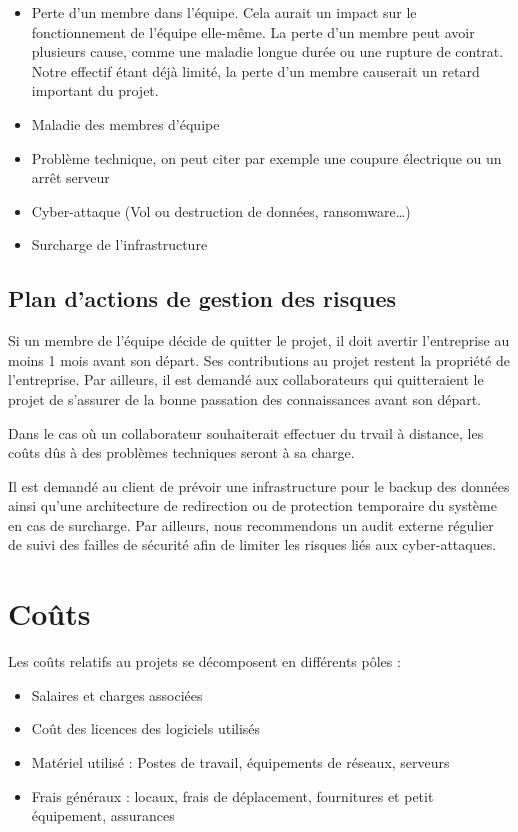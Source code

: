 \documentclass[a4paper]{article}
\begin{document}
\begin{itemize}
\item Perte d’un membre dans l’équipe. Cela aurait un impact sur le fonctionnement de l'équipe elle-même. La perte d'un membre peut avoir plusieurs cause, comme une maladie longue durée ou une rupture de contrat. Notre effectif étant déjà limité, la perte d’un membre causerait un retard important du projet.

\item Maladie des membres d'équipe
\item Problème technique, on peut citer par exemple une coupure électrique ou un arrêt serveur
\item Cyber-attaque (Vol ou destruction de données, ransomware…)
\item Surcharge de l'infrastructure 
\end{itemize}

        \subsection*{Plan d’actions de gestion des risques}

Si un membre de l’équipe décide de quitter le projet, il doit avertir l’entreprise au moins 1 mois avant son départ. Ses contributions au projet restent la propriété de l’entreprise. Par ailleurs, il est demandé aux collaborateurs qui quitteraient le projet de s’assurer de la bonne passation des connaissances avant son départ. 

Dans le cas où un collaborateur souhaiterait effectuer du trvail à distance, les coûts dûs à des problèmes techniques seront à sa charge. 

Il est demandé au client de prévoir une infrastructure pour le backup des données ainsi qu'une architecture de redirection ou de protection temporaire du système en cas de surcharge. Par ailleurs, nous recommendons un audit externe régulier de suivi des failles de sécurité afin de limiter les risques liés aux cyber-attaques.

	\newpage
	
	
	
	
	
	
	\section{Coûts}
Les coûts relatifs au projets se décomposent en différents pôles :
\begin{itemize}
    \item Salaires et charges associées
    \item Coût des licences des logiciels utilisés
    \item Matériel utilisé : Postes de travail, équipements de réseaux, serveurs
    \item Frais généraux : locaux, frais de déplacement, fournitures et petit équipement, assurances
\end{itemize}
\end{document}
